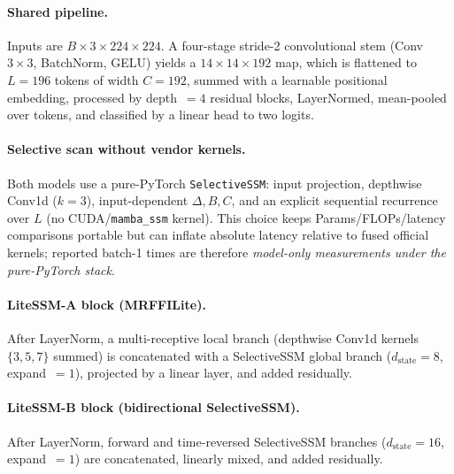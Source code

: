\paragraph{Shared pipeline.}
Inputs are $B\times3\times224\times224$.
A four-stage stride-2 convolutional stem (Conv $3\times3$, BatchNorm, GELU) yields a $14\times14\times192$ map, which is flattened to $L=196$ tokens of width $C=192$, summed with a learnable positional embedding, processed by depth~$=4$ residual blocks, LayerNormed, mean-pooled over tokens, and classified by a linear head to two logits.

\paragraph{Selective scan without vendor kernels.}
Both models use a pure-PyTorch \texttt{SelectiveSSM}: input projection, depthwise Conv1d ($k=3$), input-dependent $\Delta,B,C$, and an explicit sequential recurrence over $L$ (no CUDA/\texttt{mamba\_ssm} kernel).
This choice keeps Params/FLOPs/latency comparisons portable but can inflate absolute latency relative to fused official kernels; reported batch-1 times are therefore \emph{model-only measurements under the pure-PyTorch stack}.

\paragraph{LiteSSM-A block (MRFFILite).}
After LayerNorm, a multi-receptive local branch (depthwise Conv1d kernels $\{3,5,7\}$ summed) is concatenated with a SelectiveSSM global branch ($d_{\mathrm{state}}=8$, expand~$=1$), projected by a linear layer, and added residually.

\paragraph{LiteSSM-B block (bidirectional SelectiveSSM).}
After LayerNorm, forward and time-reversed SelectiveSSM branches ($d_{\mathrm{state}}=16$, expand~$=1$) are concatenated, linearly mixed, and added residually.

